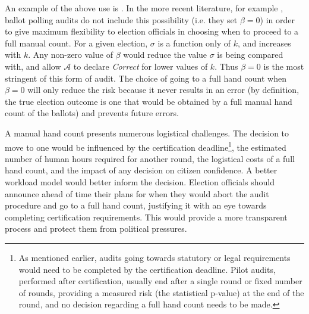 An example of the above use is \cite{RLA}. In the more recent literature, for example \cite{bravo}, ballot polling audits do not include this possibility (i.e. they set $\beta=0$) in order to give maximum flexibility to election officials in choosing when to proceed to a full manual count. For a given election, $\sigma$ is a function only of $k$, and increases with $k$. Any non-zero value of $\beta$ would reduce the value $\sigma$ is being compared with, and allow $\mathcal{A}$ to declare \emph{Correct} for lower values of $k$. Thus $\beta = 0$ is the most stringent of this form of audit. The choice of going to a full hand count when $\beta=0$ will only reduce the risk because it never results in an error (by definition, the true election outcome is one that would be obtained by a full manual hand count of the ballots) and prevents future errors. 

A manual hand count presents numerous logistical challenges. The decision to move to one would be influenced by the certification deadline\footnote{As mentioned earlier, audits going towards statutory or legal requirements would need to be completed by the certification deadline. Pilot audits, performed after certification, usually end after a single round or fixed number of rounds, providing a measured risk (the statistical p-value) at the end of the round, and no decision regarding a full hand count needs to be made.}, the estimated number of human hours required for another round, the logistical costs of a full hand count, and the impact of any decision on citizen confidence. A better workload model would better inform the decision. %
Election officials should announce ahead of time their plans for when they would abort the audit procedure and go to a full hand count, justifying it with an eye towards completing certification requirements. This would provide a more transparent process and protect them from political pressures. 

